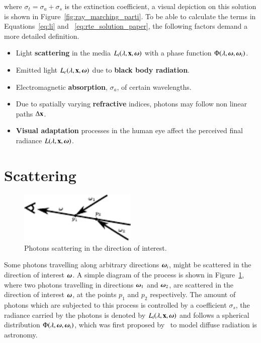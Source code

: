 where $\sigma_t = \sigma_a + \sigma_s$ is the extinction coefficient, a visual depiction on this solution is shown in Figure~\ref{fig:ray_marching_parti}.
To be able to calculate the terms in Equations~\ref{eq:li} and ~\ref{eq:rte_solution_paper}, the following factors demand a more detailed definition.

\begin{itemize}
\item Light \textbf{scattering} in the media $L_i(\lambda, \mathbf{x}, \boldsymbol{\omega})$ with a phase function $\Phi(\lambda, \boldsymbol{\omega}, \boldsymbol{\omega}_i)$.
\item Emitted light $L_e(\lambda, \mathbf{x}, \boldsymbol{\omega})$ due to \textbf{black body radiation}.
\item Electromagnetic \textbf{absorption}, $\sigma_a$, of certain wavelengths.
\item Due to spatially varying \textbf{refractive} indices, photons may follow non linear paths $\Delta\mathbf{x}$.
\item \textbf{Visual adaptation} processes in the human eye affect the perceived final radiance $L(\lambda, \mathbf{x}, \boldsymbol{\omega})$.
\end{itemize}

\section{Scattering}
\label{sec:scattering}

\begin{figure}[htbp!]
	\centering
	\includegraphics[width=0.5\textwidth]{img/scattering_diag}
	\caption{Photons scattering in the direction of interest.}
	\label{fig:scattering_diag}
\end{figure}

Some photons travelling along arbitrary directions $\boldsymbol{\omega}_i$, might be scattered in the direction of interest $\boldsymbol{\omega}$.
A simple diagram of the process is shown in Figure~\ref{fig:scattering_diag}, where two photons travelling in directions $\boldsymbol{\omega}_1$ and $\boldsymbol{\omega}_2$, are scattered in the direction of interest $\boldsymbol{\omega}$, at the points $p_1$ and $p_2$ respectively.
The amount of photons which are subjected to this process is controlled by a coefficient $\sigma_s$, the radiance carried by the photons is denoted by $L_i(\lambda, \mathbf{x}, \boldsymbol{\omega})$ and follows a spherical distribution $\Phi (\lambda, \boldsymbol{\omega}, \boldsymbol{\omega}_i)$, which was first proposed by~\cite{Henyey:1941} to model diffuse radiation is astronomy.

